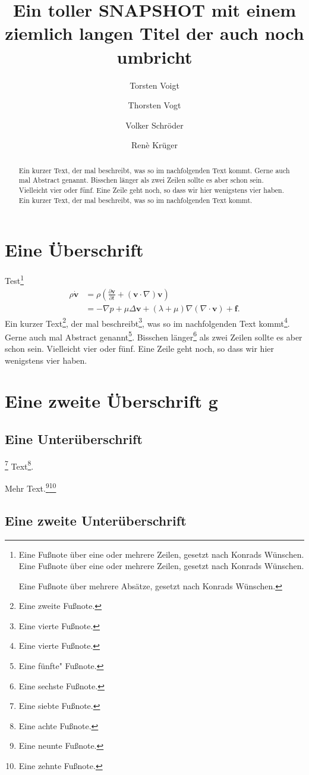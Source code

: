 \documentclass{mfosnapshot}
\author{Torsten Voigt \and Thorsten Vogt \and Volker Schr\"oder \and Ren\`e Kr\"uger}
\title{Ein toller SNAPSHOT mit einem ziemlich langen Titel der auch noch umbricht}
\begin{document}
\begin{abstract}
Ein kurzer Text, der mal beschreibt, was so im nachfolgenden Text kommt. Gerne auch mal Abstract genannt. Bisschen l\"anger als zwei Zeilen sollte es aber schon sein. Vielleicht vier oder f\"unf. Eine Zeile geht noch, so dass wir hier wenigstens vier haben. Ein kurzer Text, der mal beschreibt, was so im nachfolgenden Text kommt.
\end{abstract}

\section{Eine \"Uberschrift}
\noindent\blindtext[1]Test\footnote{Eine Fu\ss note \"uber eine oder mehrere Zeilen, gesetzt nach Konrads W\"unschen. Eine Fu\ss note \"uber eine oder mehrere Zeilen, gesetzt nach Konrads W\"unschen.

Eine Fu\ss note \"uber mehrere Abs\"atze, gesetzt nach Konrads W\"unschen.}
\begin{align}
	\rho \dot{\mathbf{v}}
	 &= \rho \left( \frac{\partial\mathbf{v}}{\partial t} + (\mathbf{v} \cdot \nabla) \mathbf{v} \right)\\
	 &=-\nabla p + \mu \Delta \mathbf{v} + (\lambda + \mu) \nabla (\nabla \cdot \mathbf{v})+\mathbf{f}.
\end{align}
Ein kurzer Text\footnote{Eine zweite Fu\ss note.}, der mal beschreibt\footnote{Eine vierte Fu\ss note.}, was so im nachfolgenden Text kommt\footnote{Eine vierte Fu\ss note.}. Gerne auch mal Abstract genannt\footnote{Eine f\"unfte" Fu\ss note.}. Bisschen l\"anger\footnote{Eine sechste Fu\ss note.} als zwei Zeilen sollte es aber schon sein. Vielleicht vier oder f\"unf. Eine Zeile geht noch, so dass wir hier wenigstens vier haben.

\section{Eine zweite \"Uberschrift g}
\subsection{Eine Unter\"uberschrift}
\blindtext\footnote{Eine siebte Fu\ss note.} Text\footnote{Eine achte Fu\ss note.}.

\blindtext Mehr Text.\footnote{Eine neunte Fu\ss note.}\footnote{Eine zehnte Fu\ss note.}

\subsection{Eine zweite Unter\"uberschrift}
\end{document}
